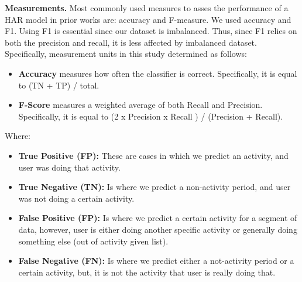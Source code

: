 \documentclass[journal,article,submit,moreauthors,pdftex]{Definitions/mdpi}
\begin{document}
\noindent \textbf{Measurements.} Most commonly used measures to asses the performance of a HAR model in prior works are: accuracy\cite{brownlee2018gentle,zhang2011feature,mehrang2017human} and F-measure\cite{rosati2018comparison,Nourani_CoMoRea2019}. We used accuracy and F1. Using F1 is essential since our dataset is imbalanced. Thus, since F1 relies on both the precision and recall, it is less affected by imbalanced dataset. Specifically, measurement units in this study determined as follows:
\begin{itemize}
	\item \noindent \textbf{Accuracy} measures how often the classifier is correct. Specifically, it is equal to (TN + TP) / total.
	\item \noindent \textbf{F-Score} measures a weighted average of both Recall and Precision. Specifically, it is equal to (2 x Precision x Recall ) / (Precision + Recall). 
\end{itemize}

Where:
\begin{itemize}
	
	\item \textbf{True Positive (FP):} These are cases in which we predict an activity, and user was doing that activity.
	
	\item \textbf{True Negative (TN):} Is where we predict a non-activity period, and user was not doing a certain activity.
	
	\item \textbf{False Positive (FP):} Is where we predict a certain activity for a segment of data, however, user is either doing another specific activity or generally doing something else (out of activity given list).
	
	\item \textbf{False Negative (FN):} Is where we predict either a not-activity period or a certain activity, but, it is not the activity that user is really doing that.
	
\end{itemize}
\end{document}
